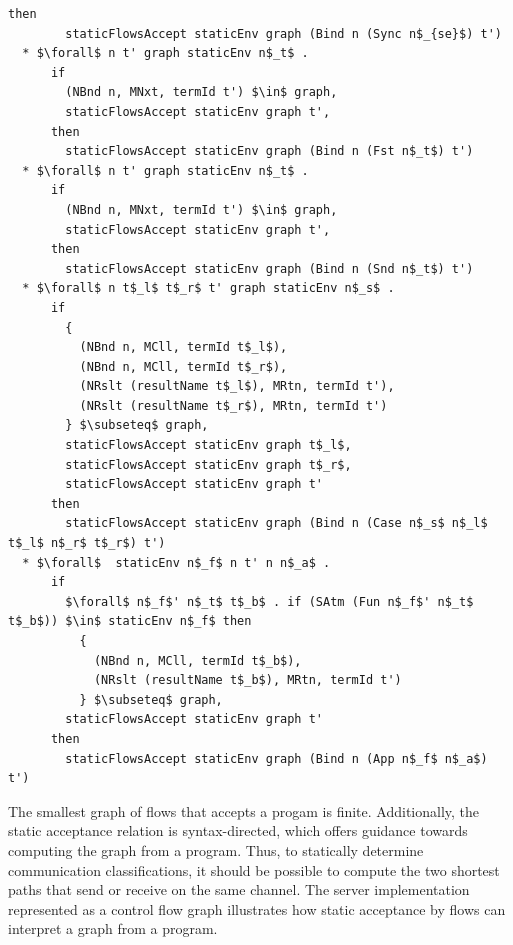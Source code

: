\documentclass[letterpaper, 11pt]{extarticle}
\begin{document}
\begin{lstlisting}[language=logic, mathescape]
      then
        staticFlowsAccept staticEnv graph (Bind n (Sync n$_{se}$) t')
  * $\forall$ n t' graph staticEnv n$_t$ .
      if
        (NBnd n, MNxt, termId t') $\in$ graph, 
        staticFlowsAccept staticEnv graph t', 
      then
        staticFlowsAccept staticEnv graph (Bind n (Fst n$_t$) t')
  * $\forall$ n t' graph staticEnv n$_t$ .
      if
        (NBnd n, MNxt, termId t') $\in$ graph, 
        staticFlowsAccept staticEnv graph t', 
      then
        staticFlowsAccept staticEnv graph (Bind n (Snd n$_t$) t')
  * $\forall$ n t$_l$ t$_r$ t' graph staticEnv n$_s$ .
      if
        {
          (NBnd n, MCll, termId t$_l$),
          (NBnd n, MCll, termId t$_r$),
          (NRslt (resultName t$_l$), MRtn, termId t'),
          (NRslt (resultName t$_r$), MRtn, termId t')
        } $\subseteq$ graph, 
        staticFlowsAccept staticEnv graph t$_l$, 
        staticFlowsAccept staticEnv graph t$_r$,
        staticFlowsAccept staticEnv graph t'
      then
        staticFlowsAccept staticEnv graph (Bind n (Case n$_s$ n$_l$ t$_l$ n$_r$ t$_r$) t')
  * $\forall$  staticEnv n$_f$ n t' n n$_a$ .
      if
        $\forall$ n$_f$' n$_t$ t$_b$ . if (SAtm (Fun n$_f$' n$_t$ t$_b$)) $\in$ staticEnv n$_f$ then 
          {
            (NBnd n, MCll, termId t$_b$),
            (NRslt (resultName t$_b$), MRtn, termId t')
          } $\subseteq$ graph,
        staticFlowsAccept staticEnv graph t'
      then
        staticFlowsAccept staticEnv graph (Bind n (App n$_f$ n$_a$) t')
\end{lstlisting}

The smallest graph of flows that accepts a progam is finite.  Additionally, the static
acceptance relation is syntax-directed, which offers guidance towards computing the graph
from a program. Thus, to statically determine communication classifications, it should
be possible to compute the two shortest paths that send or receive on the same channel. 
The server implementation represented as a control flow graph
illustrates how static acceptance by flows can interpret a graph from a program.
\end{document}
